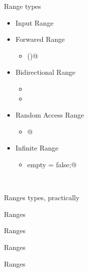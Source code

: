 \documentclass[aspectratio=169,notes]{beamer}
\begin{document}
	\begin{frame}[fragile]{Range types}
		\begin{itemize}
			\item Input Range
				\pause
			\item Forwared Range
			\begin{itemize}
				\item \lstinline@save()@
			\end{itemize}
			\item Bidirectional Range
			\begin{itemize}
				\item \lstinline@back@
				\item \lstinline@popBack@
			\end{itemize}
			\item Random Access Range
			\begin{itemize}
				\item \lstinline@[]@
			\end{itemize}
			\item Infinite Range
			\begin{itemize}
				\item \lstinline@enum empty = false;@
			\end{itemize}
		\end{itemize}\mbox{}\\[1cm]
	\end{frame}
	\begin{frame}[fragile]{Ranges types, practically}
		
	\end{frame}

	\begin{frame}[fragile]{Ranges}
		
	\end{frame}

	\begin{frame}[fragile]{Ranges}
		
	\end{frame}

	\begin{frame}[fragile]{Ranges}
		
	\end{frame}

	\begin{frame}[fragile]{Ranges}
		
	\end{frame}
\end{document}
